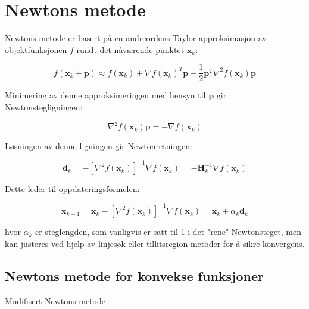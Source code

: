 \section{Newtons metode}
\label{sec:newtons_method}
Newtons metode er basert på en andreordens Taylor-approksimasjon av objektfunksjonen \(f\) rundt det nåværende punktet \(\symbf{x}_k\):

\[
	f(\symbf{x}_k + \symbf{p}) \approx f(\symbf{x}_k) + \nabla f(\symbf{x}_k)^T \symbf{p} + \frac{1}{2}\symbf{p}^T \nabla^2 f(\symbf{x}_k) \symbf{p}
\]

Minimering av denne approksimeringen med hensyn til \(\symbf{p}\) gir Newtonstegligningen:

\[
	\nabla^2 f(\symbf{x}_k) \symbf{p} = -\nabla f(\symbf{x}_k)
\]

Løsningen av denne ligningen gir Newtonretningen:

\[
	\symbf{d}_k = -[\nabla^2 f(\symbf{x}_k)]^{-1} \nabla f(\symbf{x}_k) = -\symbf{H}_k^{-1} \nabla f(\symbf{x}_k)
\]

Dette leder til oppdateringsformelen:

\[
	\symbf{x}_{k+1} = \symbf{x}_k - [\nabla^2 f(\symbf{x}_k)]^{-1} \nabla f(\symbf{x}_k) = \symbf{x}_k + \alpha_k \symbf{d}_k
\]

hvor \(\alpha_k\) er steglengden, som vanligvis er satt til 1 i det "rene" Newtonsteget, men kan justeres ved hjelp av linjesøk eller tillitsregion-metoder for å sikre konvergens.

\subsection{Newtons metode for konvekse funksjoner}
\label{subsec:newton_convex}

\begin{algorithm}[H]
	\SetAlgoLined
	\caption{Modifisert Newtons metode}
	\label{alg:modified_newton}
\end{algorithm}

